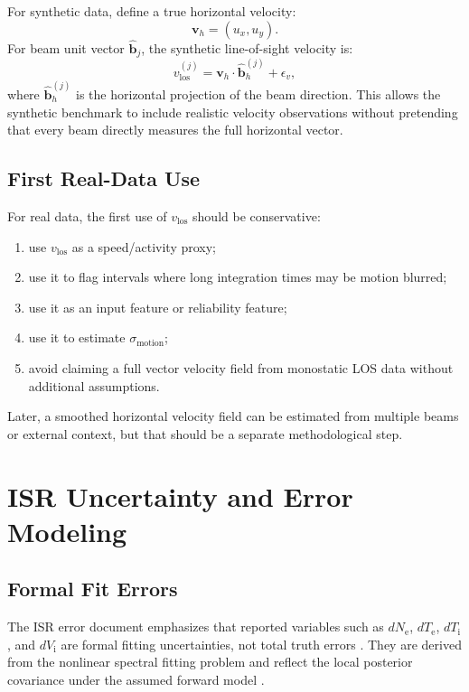 \documentclass[11pt]{article}
\newcommand{\Ne}{N_{\mathrm e}}
\newcommand{\Te}{T_{\mathrm e}}
\newcommand{\Ti}{T_{\mathrm i}}
\newcommand{\Vi}{V_{\mathrm i}}
\newcommand{\vlos}{v_{\mathrm{los}}}
\begin{document}
For synthetic data, define a true horizontal velocity:
\begin{equation}
  \mathbf{v}_{h} = (u_x,u_y).
\end{equation}
For beam unit vector $\hat{\mathbf{b}}_j$, the synthetic line-of-sight velocity is:
\begin{equation}
  \vlos^{(j)}
  =
  \mathbf{v}_{h}\cdot \hat{\mathbf{b}}_{h}^{(j)}
  +
  \epsilon_v,
\end{equation}
where $\hat{\mathbf{b}}_{h}^{(j)}$ is the horizontal projection of the beam direction. This allows
the synthetic benchmark to include realistic velocity observations without pretending that every
beam directly measures the full horizontal vector.

\subsection{First Real-Data Use}

For real data, the first use of $\vlos$ should be conservative:
\begin{enumerate}[leftmargin=*]
  \item use $\vlos$ as a speed/activity proxy;
  \item use it to flag intervals where long integration times may be motion blurred;
  \item use it as an input feature or reliability feature;
  \item use it to estimate $\sigma_{\mathrm{motion}}$;
  \item avoid claiming a full vector velocity field from monostatic LOS data without additional
  assumptions.
\end{enumerate}

Later, a smoothed horizontal velocity field can be estimated from multiple beams or external
context, but that should be a separate methodological step.

\section{ISR Uncertainty and Error Modeling}

\subsection{Formal Fit Errors}

The ISR error document emphasizes that reported variables such as $d\Ne$, $d\Te$, $d\Ti$, and
$d\Vi$ are formal fitting uncertainties, not total truth errors \cite{Diaz2026ISRError}. They are
derived from the nonlinear spectral fitting problem and reflect the local posterior covariance under
the assumed forward model \cite{Lehtinen1986,LehtinenHuuskonen1996,Virtanen2008,Virtanen2021}.
\end{document}
